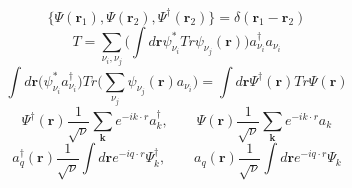 \documentclass{article}
\begin{document}
\begin{equation*}
    \{ \Psi(\textbf{r}_1),\Psi(\textbf{r}_2),\Psi^\dagger(\textbf{r}_2)\} = \delta(\textbf{r}_1-\textbf{r}_2)
\end{equation*}
\begin{equation*}
    T=\sum_{\nu_i,\nu_j}\big( \int d\textbf{r}\psi^*_{\nu_i}Tr\psi_{\nu_j}(\textbf{r})) a^{\dagger}_{\nu_i} a_{\nu_i}
\end{equation*}
\begin{equation*}
    \int d\textbf{r}\big(\psi^*_{\nu_i}a^{\dagger}_{\nu_i})Tr\big(\sum_{\nu_j}\psi_{\nu_j}(\textbf{r})a_{\nu_i}) =  \int d\textbf{r}\Psi^\dagger(\textbf{r}) Tr \Psi (\textbf{r})
\end{equation*}
\begin{equation*}
    \Psi^{\dagger}(\textbf{r})\frac{1}{\sqrt{\nu}} \sum_{\textbf{k}}e^{-ik\cdot r} a^{\dagger}_{k}, \qquad \Psi(\textbf{r})\frac{1}{\sqrt{\nu}} \sum_{\textbf{k}}e^{-ik\cdot r} a_{k}
\end{equation*}
\begin{equation*}
    a^{\dagger}_q (\textbf{r}) \frac{1}{\sqrt{\nu}} \int d{\textbf{r}}e^{-iq\cdot r} \Psi^{\dagger}_{k}, \qquad a_q(\textbf{r}) \frac{1}{\sqrt{\nu}} \int d{\textbf{r}}e^{-iq\cdot r} \Psi_{k}
\end{equation*}
    
\end{document}
